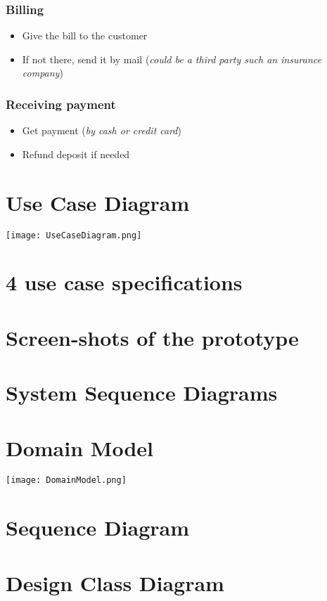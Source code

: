 \documentclass{report}
\begin{document}
\section{Billing}
    \begin{itemize}
        \item Give the bill to the customer
        \item If not there, send it by mail (\textit{could be a third party such an insurance company})
    \end{itemize}

\section{Receiving payment}
    \begin{itemize}
        \item Get payment (\textit{by cash or credit card})
        \item Refund deposit if needed
    \end{itemize}

\part{Use Case Diagram}
\texttt{[image: UseCaseDiagram.png]}

\part{4 use case specifications}
\part{Screen-shots of the prototype}
\part{System Sequence Diagrams}
\part{Domain Model}
\begin{center}
    \texttt{[image: DomainModel.png]}
\end{center}
\part{Sequence Diagram}
\part{Design Class Diagram}
\end{document}
